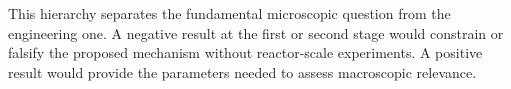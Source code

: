 This hierarchy separates the fundamental microscopic question from the engineering one. A negative result at the first or second stage would constrain or falsify the proposed mechanism without reactor-scale experiments. A positive result would provide the parameters needed to assess macroscopic relevance.
